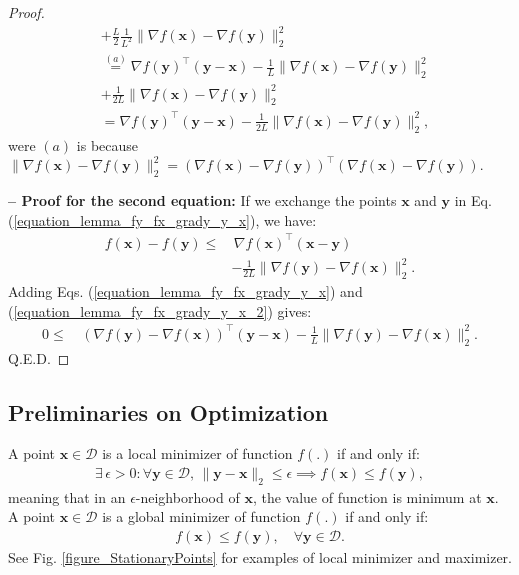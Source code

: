 \documentclass[lang=cn,10pt]{gorgeousnbook}
\numberwithin{equation}{section}%
\numberwithin{figure}{section}%
\begin{document}
\begin{proof}
\begin{align*}
&+ \frac{L}{2} \frac{1}{L^2} \|\nabla f(\boldsymbol{x}) - \nabla f(\boldsymbol{y})\|_2^2 \\
&\overset{(a)}{=} \nabla f(\boldsymbol{y})^\top (\boldsymbol{y} - \boldsymbol{x}) - \frac{1}{L} \|\nabla f(\boldsymbol{x}) - \nabla f(\boldsymbol{y})\|_2^2 \\
&+ \frac{1}{2L} \|\nabla f(\boldsymbol{x}) - \nabla f(\boldsymbol{y})\|_2^2 \\
&= \nabla f(\boldsymbol{y})^\top (\boldsymbol{y} - \boldsymbol{x}) - \frac{1}{2L} \|\nabla f(\boldsymbol{x}) - \nabla f(\boldsymbol{y})\|_2^2,
\end{align*}
were $(a)$ is because $\|\nabla f(\boldsymbol{x}) - \nabla f(\boldsymbol{y})\|_2^2 = (\nabla f(\boldsymbol{x}) - \nabla f(\boldsymbol{y}))^\top (\nabla f(\boldsymbol{x}) - \nabla f(\boldsymbol{y}))$. 

\textbf{-- Proof for the second equation:}
If we exchange the points $\boldsymbol{x}$ and $\boldsymbol{y}$ in Eq. (\ref{equation_lemma_fy_fx_grady_y_x}), we have:
\begin{align}
f(\boldsymbol{x}) - f(\boldsymbol{y}) \leq &\,\nabla f(\boldsymbol{x})^\top (\boldsymbol{x} - \boldsymbol{y}) \nonumber \\
&- \frac{1}{2 L} \|\nabla f(\boldsymbol{y}) - \nabla f(\boldsymbol{x})\|_2^2. \label{equation_lemma_fy_fx_grady_y_x_2}
\end{align}
Adding Eqs. (\ref{equation_lemma_fy_fx_grady_y_x}) and (\ref{equation_lemma_fy_fx_grady_y_x_2}) gives:
\begin{align*}
0 \leq &\,(\nabla f(\boldsymbol{y}) - \nabla f(\boldsymbol{x}))^\top (\boldsymbol{y} - \boldsymbol{x}) - \frac{1}{L} \|\nabla f(\boldsymbol{y}) - \nabla f(\boldsymbol{x})\|_2^2.
\end{align*}
Q.E.D.
\end{proof}

\subsection{Preliminaries on Optimization}

\begin{definition}
A point $\boldsymbol{x} \in \mathcal{D}$ is a local minimizer of function $f(.)$ if and only if:
\begin{align}\label{equation_local_minimizer}
\exists\, \epsilon > 0 : \forall \boldsymbol{y} \in \mathcal{D},\, \|\boldsymbol{y} - \boldsymbol{x}\|_2 \leq \epsilon \implies f(\boldsymbol{x}) \leq f(\boldsymbol{y}),
\end{align}
meaning that in an $\epsilon$-neighborhood of $\boldsymbol{x}$, the value of function is minimum at $\boldsymbol{x}$.
A point $\boldsymbol{x} \in \mathcal{D}$ is a global minimizer of function $f(.)$ if and only if:
\begin{align}\label{equation_global_minimizer}
f(\boldsymbol{x}) \leq f(\boldsymbol{y}), \quad \forall \boldsymbol{y} \in \mathcal{D}.
\end{align}
See Fig. \ref{figure_StationaryPoints} for examples of local minimizer and maximizer.
\end{definition}
\end{document}
